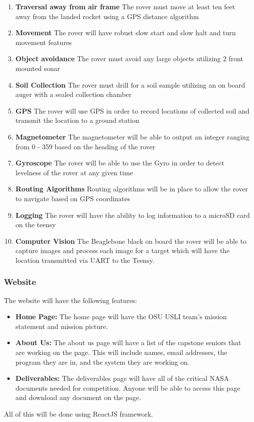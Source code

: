 \documentclass[onecolumn, draftclsnofoot, 10pt, compsoc]{IEEEtran}
\begin{document}
\begin{enumerate}
\item \textbf{Traversal away from air frame} The rover must move at least ten feet away from the landed rocket using a GPS distance algorithm
\item \textbf{Movement} The rover will have robust slow start and slow halt and turn movement features
\item \textbf{Object avoidance} The rover must avoid any large objects utilizing 2 front mounted sonar 
\item \textbf{Soil Collection} The rover must drill for a soil sample utilizing an on board auger with a sealed collection chamber
\item \textbf{GPS} The rover will use GPS in order to record locations of collected soil and transmit the location to a ground station
\item \textbf{Magnetometer} The magnetometer will be able to output an integer ranging from 0 - 359 based on the heading of the rover
\item \textbf{Gyroscope} The rover will be able to use the Gyro in order to detect levelness of the rover at any given time
\item \textbf{Routing Algorithms} Routing algorithms will be in place to allow the rover to navigate based on GPS coordinates
\item \textbf{Logging} The rover will have the ability to log information to a microSD card on the teensy
\item \textbf{Computer Vision} The Beaglebone black on board the rover will be able to capture images and process each image for a target which will have the location transmitted via UART to the Teensy. 
\end{enumerate}


\subsubsection{Website}
The website will have the following features: 
\begin{itemize}
    \item \textbf{Home Page:} The home page will have the OSU USLI team's mission statement and mission picture. 
    \item \textbf{About Us:} The about us page will have a list of the capstone seniors that are working on the page. This will include names, email addresses, the program they are in, and the system they are working on. 
    \item \textbf{Deliverables:} The deliverables page will have all of the critical NASA documents needed for competition. Anyone will be able to access this page and download any document on the page. 
\end{itemize}
All of this will be done using ReactJS framework. 
\end{document}
